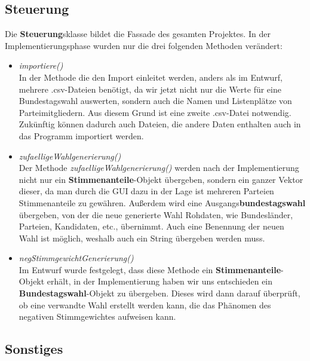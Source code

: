 \documentclass[12pt,a4paper,titlepage]{article}
\newcommand{\myma}{\fontfamily{pcr}\selectfont \textbf}
\newcommand{\mymo}{\fontfamily{pcr}\selectfont \textit}
\begin{document}
\subsection{Steuerung}
Die {\myma{Steuerung}}sklasse bildet die Fassade des gesamten Projektes. In der Implementierungsphase wurden nur die drei folgenden Methoden verändert:
\begin{itemize}
\item {\mymo{importiere()}}\\
In der Methode die den Import einleitet werden, anders als im Entwurf, mehrere .csv-Dateien benötigt, da wir jetzt nicht nur die Werte für eine Bundestagswahl auswerten, sondern auch die Namen und Listenplätze von Parteimitgliedern. 
Aus diesem Grund ist eine zweite .csv-Datei notwendig.\\
Zukünftig können dadurch auch Dateien, die andere Daten enthalten auch in das Programm importiert werden.\\
 
\item {\mymo{zufaelligeWahlgenerierung()}}\\
Der Methode {\mymo{zufaelligeWahlgenerierung()}} werden nach der Implementierung nicht nur ein {\myma{Stimmenanteile}}-Objekt übergeben, sondern ein ganzer Vektor dieser, da man durch die GUI dazu in der Lage ist
mehreren Parteien Stimmenanteile zu gewähren. Außerdem wird eine Ausgangs{\myma{bundestagswahl}} übergeben, von der die neue generierte Wahl Rohdaten, wie Bundesländer, Parteien, Kandidaten, etc., übernimmt. Auch eine Benennung der neuen Wahl ist möglich, weshalb auch ein String übergeben werden muss.\\

\item {\mymo{negStimmgewichtGenerierung()}}\\
Im Entwurf wurde festgelegt, dass diese Methode ein {\myma{Stimmenanteile}}-Objekt erhält, in der Implementierung haben wir uns entschieden ein {\myma{Bundestagswahl}}-Objekt zu übergeben. Dieses wird dann darauf überprüft, ob eine verwandte Wahl erstellt werden kann, die das Phänomen des negativen Stimmgewichtes aufweisen kann. \\

\end{itemize}
	
	\subsection{Sonstiges}
\end{document}
